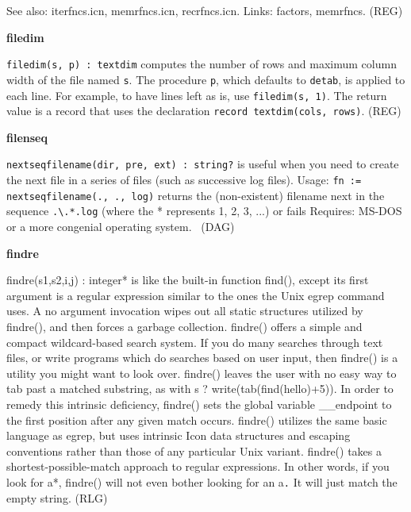 See also: iterfncs.icn, memrfncs.icn, recrfncs.icn. Links: factors,
memrfncs. (REG)

{\sffamily\bfseries
filedim}

\texttt{filedim(s, p) : textdim} computes the number of rows and maximum
column width of the file named \texttt{s}. The procedure \texttt{p},
which defaults to \texttt{detab}, is applied to each line. For example,
to have lines left as is, use \texttt{filedim(s, 1)}. The return value
is a record that uses the declaration \texttt{record textdim(cols,
rows)}. (REG)

{\sffamily\bfseries
filenseq}

\texttt{nextseqfilename(dir, pre, ext) : string?} is useful when you
need to create the next file in a series of files (such as successive
log files). Usage: \texttt{fn :=
nextseqfilename({\textquotedbl}.{\textquotedbl},
{\textquotedbl}.{\textquotedbl}, {\textquotedbl}log{\textquotedbl})}
returns the (non-existent) filename next in the sequence
\texttt{.{\textbackslash}.*.log} (where the * represents 1, 2, 3, ...)
or fails Requires: MS-DOS or a more congenial operating system. \ (DAG)

{\sffamily\bfseries
findre}

\textsf{findre(s1,s2,i,j) : integer*} is like the built-in function
\textsf{find()}, except its first argument is a regular expression similar to the ones the Unix
egrep command uses. A no argument invocation wipes out all
static structures utilized by \textsf{findre()}, and
then forces a garbage collection.
\textsf{findre()} offers a simple and compact wildcard-based search
system. If you do many searches through text files, or write programs
which do searches based on user input, then \textsf{findre()} is a
utility you might want to look over. \textsf{findre()} leaves the user
with no easy way to tab past a matched substring, as with \textsf{s ?
write(tab(find({\textquotedbl}hello{\textquotedbl})+5))}. In order to
remedy this intrinsic deficiency, \textsf{findre()} sets the global
variable \textsf{\_\_endpoint} to the first position after any given
match occurs. \textsf{findre()} utilizes the same basic language as
egrep, but uses intrinsic Icon data structures and escaping conventions
rather than those of any particular Unix variant. \textsf{findre()}
takes a shortest-possible-match approach to regular expressions. In
other words, if you look for \textsf{{\textquotedbl}a*{\textquotedbl}},
\textsf{findre()} will not even bother looking for an
\textsf{{\textquotedbl}a{\textquotedbl}}\texttt{.} It will just match
the empty string. (RLG)

